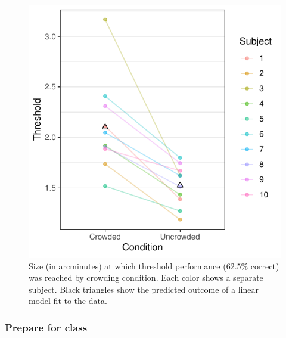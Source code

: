 \documentclass[
]{article}
\begin{document}
\begin{figure}

{\centering \includegraphics{tutorial_files/figure-latex/unnamed-chunk-9-1} 

}

\caption{Size (in arcminutes) at which threshold performance (62.5\% correct) was reached by crowding condition. Each color shows a separate subject. Black triangles show the predicted outcome of a linear model fit to the data.}\label{fig:unnamed-chunk-9}
\end{figure}

\normalsize

\hypertarget{prepare-for-class}{%
\subsubsection{Prepare for class}\label{prepare-for-class}}
\end{document}
